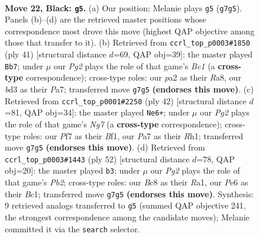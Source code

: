\documentclass[11pt]{article}
\begin{document}
\clearpage

\begin{figure}[p]\centering
\begin{subfigure}{0.46\textwidth}\centering
\resizebox{\linewidth}{!}{%
\newchessgame
\chessboard[
  setfen={1rb1k2r/p1p2pp1/2pqp2p/8/2P5/3B1Q2/P7/R2KR3 b k - 0 22},
  showmover=false,
  pgfstyle=straightmove, color=movearrow, markmove={g7-g5}
]}
\caption{}
\end{subfigure}\hfill
\begin{subfigure}{0.46\textwidth}\centering
\resizebox{\linewidth}{!}{%
\newchessgame
\chessboard[
  setfen={r1b5/p4p1p/2p1pk2/Q3p3/3q3P/8/P3BPP1/2R2K2 b - - 5 21},
  showmover=false,
  pgfstyle=straightmove, color=movearrow, markmove={c8-b7}
]}
\caption{}
\end{subfigure}
\\[4pt]
\begin{subfigure}{0.46\textwidth}\centering
\resizebox{\linewidth}{!}{%
\newchessgame
\chessboard[
  setfen={2rk3r/1p1n2Np/3p4/p7/b3P3/q1P5/2PQ2PP/1K1R1B1R w - - 5 22},
  showmover=false,
  pgfstyle=straightmove, color=movearrow, markmove={g7-e6}
]}
\caption{}
\end{subfigure}\hfill
\begin{subfigure}{0.46\textwidth}\centering
\resizebox{\linewidth}{!}{%
\newchessgame
\chessboard[
  setfen={2r1k1r1/p2qbp2/6bQ/8/8/6P1/PP1P1P1P/R1B1R1K1 w - - 4 27},
  showmover=false,
  pgfstyle=straightmove, color=movearrow, markmove={b2-b3}
]}
\caption{}
\end{subfigure}
\caption{\textbf{Move 22, Black: \texttt{g5}.} (a) Our position; Melanie plays \texttt{g5} (\texttt{g7g5}). Panels (b)--(d) are the retrieved master positions whose correspondence most drove this move (highest QAP objective among those that transfer to it). (b) Retrieved from \texttt{ccrl\_top\_p0003\#1850} (ply 41) [structural distance $d$=69, QAP obj=39]: the master played \texttt{Bb7}; under $\mu$ our \emph{Pg2} plays the role of that game's \emph{Bc1} (a \textbf{cross-type} correspondence); cross-type roles: our \emph{p}a2 as their \emph{R}a8, our \emph{b}d3 as their \emph{P}a7; transferred move \texttt{g7g5} \textbf{(endorses this move)}. (c) Retrieved from \texttt{ccrl\_top\_p0001\#2250} (ply 42) [structural distance $d$=81, QAP obj=34]: the master played \texttt{Ne6+}; under $\mu$ our \emph{Pg2} plays the role of that game's \emph{Ng7} (a \textbf{cross-type} correspondence); cross-type roles: our \emph{P}f7 as their \emph{B}f1, our \emph{P}a7 as their \emph{R}h1; transferred move \texttt{g7g5} \textbf{(endorses this move)}. (d) Retrieved from \texttt{ccrl\_top\_p0003\#1443} (ply 52) [structural distance $d$=78, QAP obj=20]: the master played \texttt{b3}; under $\mu$ our \emph{Pg2} plays the role of that game's \emph{Pb2}; cross-type roles: our \emph{B}c8 as their \emph{R}a1, our \emph{P}e6 as their \emph{B}c1; transferred move \texttt{g7g5} \textbf{(endorses this move)}. Synthesis: 9 retrieved analogs transferred to \texttt{g5} (summed QAP objective 241, the strongest correspondence among the candidate moves); Melanie committed it via the \texttt{search} selector.}
\label{fig:thought-m43}
\end{figure}
\end{document}

